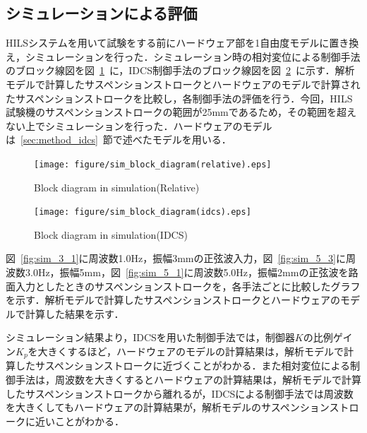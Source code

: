 \documentclass[a4paper,12pt]{article_vdlab_sotsuron}
\begin{document}
\newpage
\subsection{シミュレーションによる評価}
HILSシステムを用いて試験をする前にハードウェア部を1自由度モデルに置き換え，シミュレーションを行った．シミュレーション時の相対変位による制御手法のブロック線図を図~\ref{fig:sim_block_relative}~に，IDCS制御手法のブロック線図を図~\ref{fig:sim_block_idcs}~に示す．解析モデルで計算したサスペンションストロークとハードウェアのモデルで計算されたサスペンションストロークを比較し，各制御手法の評価を行う．今回，HILS試験機のサスペンションストロークの範囲が25mmであるため，その範囲を超えない上でシミュレーションを行った．ハードウェアのモデルは~\ref{sec:method_idcs}~節で述べたモデルを用いる．

\vspace*{5mm}
\begin{figure}[htp]
  \begin{center}
    \texttt{[image: figure/sim\_block\_diagram(relative).eps]}
    \vspace*{3mm}
    \caption{Block diagram in simulation(Relative)}
    \label{fig:sim_block_relative}
  \end{center}
\end{figure}

\begin{figure}[htp]
  \begin{center}
    \texttt{[image: figure/sim\_block\_diagram(idcs).eps]}
    \vspace*{3mm}
    \caption{Block diagram in simulation(IDCS)}
    \label{fig:sim_block_idcs}
  \end{center}
\end{figure}

\newpage
図~\ref{fig:sim_3_1}に周波数1.0Hz，振幅3mmの正弦波入力，図~\ref{fig:sim_5_3}に周波数3.0Hz，振幅5mm，図~\ref{fig:sim_5_1}に周波数5.0Hz，振幅2mmの正弦波を路面入力としたときのサスペンションストロークを，各手法ごとに比較したグラフを示す．解析モデルで計算したサスペンションストロークとハードウェアのモデルで計算した結果を示す．

シミュレーション結果より，IDCSを用いた制御手法では，制御器$K$の比例ゲイン$K_p$を大きくするほど，ハードウェアのモデルの計算結果は，解析モデルで計算したサスペンションストロークに近づくことがわかる．また相対変位による制御手法は，周波数を大きくするとハードウェアの計算結果は，解析モデルで計算したサスペンションストロークから離れるが，IDCSによる制御手法では周波数を大きくしてもハードウェアの計算結果が，解析モデルのサスペンションストロークに近いことがわかる．
\end{document}
